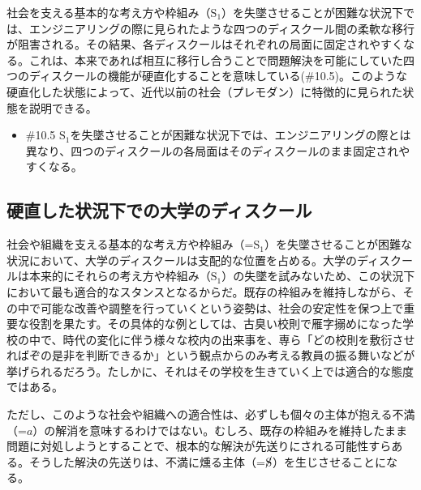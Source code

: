 社会を支える基本的な考え方や枠組み（\(\textrm{S}_1\)）を失墜させることが困難な状況下では、\mbox{エンジニアリング}の際に見られたような四つのディスクール間の柔軟な移行が阻害される。その結果、各ディスクールはそれぞれの局面に固定されやすくなる。これは、本来であれば相互に移行し合うことで問題解決を可能にしていた四つのディスクールの機能が硬直化することを意味している(\#10.5)。このような硬直化した状態によって、近代以前の社会（\mbox{プレモダン}）に特徴的に見られた状態を説明できる。

\begin{note}{}
  \begin{itemize}
    \tightlist
    \item{\#10.5}
      $\textrm{S}_1$を失墜させることが困難な状況下では、\mbox{エンジニアリング}の際とは異なり、四つのディスクールの各局面はそのディスクールのまま固定されやすくなる。
  \end{itemize}
\end{note}

\subsection{硬直した状況下での大学のディスクール}\label{ux786cux76f4ux3057ux305fux72b6ux6cc1ux4e0bux3067ux306eux5927ux5b66ux306eux30c7ux30a3ux30b9ux30afux30fcux30eb}

社会や組織を支える基本的な考え方や枠組み（=\(\textrm{S}_1\)）を失墜させることが困難な状況において、\mbox{大学のディスクール}は支配的な位置を占める。\mbox{大学のディスクール}は本来的にそれらの考え方や枠組み（\(\textrm{S}_1\)）の失墜を試みないため、この状況下において最も適合的なスタンスとなるからだ。既存の枠組みを維持しながら、その中で可能な改善や調整を行っていくという姿勢は、社会の安定性を保つ上で重要な役割を果たす。その具体的な例としては、古臭い校則で雁字搦めになった学校の中で、時代の変化に伴う様々な校内の出来事を、専ら「どの校則を敷衍させればぞの是非を判断できるか」という観点からのみ考える教員の振る舞いなどが挙げられるだろう。たしかに、それはその学校を生きていく上では適合的な態度ではある。

ただし、このような社会や組織への適合性は、必ずしも個々の主体が抱える不満（=\(a\)）の解消を意味するわけではない。むしろ、既存の枠組みを維持したまま問題に対処しようとすることで、根本的な解決が先送りにされる可能性すらある。そうした解決の先送りは、不満に燻る主体（=\(\cancel{\textrm{S}}\)）を生じさせることになる。

